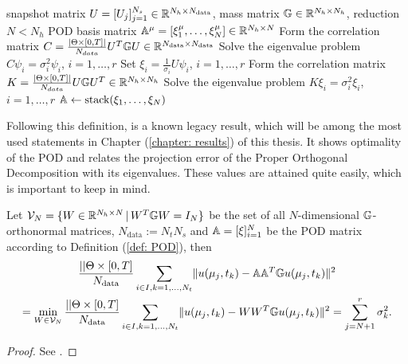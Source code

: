 \begin{algorithm}
    \caption{Generalized Proper Orthogonal Decomposition (POD)} \label{algo: pod}
    \begin{algorithmic}[1]
        \Require snapshot matrix $U = [U_j]_{j=1}^{N_s} \in \mathbb{R}^{N_h \times N_\text{data}}$, 
        mass matrix $\mathbb{G} \in \mathbb{R}^{N_h \times N_h}$,
        reduction $N < N_h$
        \Ensure POD basis matrix $\mathbb{A}^\mu = [\xi^\mu_1, \dots, \xi^\mu_N] \in \mathbb{R}^{N_h \times N}$
            \State Form the correlation matrix $C = \frac{\vert \Theta \times [0, T] \vert}{N_{data}} U^T \mathbb{G} U
            \in \mathbb{R}^{N_\text{data} \times N_\text{data}}$
            \State Solve the eigenvalue problem $C \psi_i = \sigma_i^2 \psi_i$, \quad $i=1,\dots,r$
            \State Set $\xi_i = \tfrac{1}{\sigma_i} U \psi_i$, \quad $i=1,\dots,r$
        \Else
            \State Form the correlation matrix $K = \frac{\vert \Theta \times [0, T] \vert}{N_{data}} 
            U \mathbb{G} U^T \in \mathbb{R}^{N_h \times N_h}$
            \State Solve the eigenvalue problem $K \xi_i = \sigma_i^2 \xi_i$, \quad $i=1,\dots,r$
        \EndIf
        \State $\mathbb{A} \gets \text{stack}(\xi_1, \dots, \xi_N)$
    \end{algorithmic}
\end{algorithm}


Following this definition, is a known legacy result, which will be among
the most used statements in Chapter (\ref{chapter: results}) of this thesis.
It shows optimality of the POD 
and relates the projection error of the Proper Orthogonal Decomposition with its eigenvalues. 
These values are attained quite easily, which is important to keep in mind. 


\begin{proposition} \label{prop: eigenvalues and optimal projection under sampling}
    Let $\mathcal{V}_N = \{ W \in \mathbb{R}^{N_h \times N} \, \vert \, W^T \mathbb{G} W = I_N \}$ be the set of all 
    $N$-dimensional $\mathbb{G}$-orthonormal matrices, 
    $N_\text{data} := N_t N_s$ and $\mathbb{A} = [\xi]_{i=1}^N$ be the POD matrix according to Definition
    (\ref{def: POD}), then
    \begin{multline*}
        \frac{\lvert  \rvert\Theta \times [0, T]}{N_\text{data}}
        \sum\limits_{i \in I, k = 1, \dots, N_t} \lVert u(\mu_j, t_k) - \mathbb{A} \mathbb{A}^T \mathbb{G} u(\mu_j, t_k) \rVert^2 \\
        = \min\limits_{W \in \mathcal{V}_N} \frac{\lvert  \rvert\Theta \times [0, T]}{N_\text{data}} 
        \sum\limits_{i \in I, k = 1, \dots, N_t} 
        \lVert u(\mu_j, t_k) - W W^T \mathbb{G} u(\mu_j, t_k) \rVert^2 
        = \sum_{j=N+1}^r \sigma_k^2.
    \end{multline*}
\end{proposition}
\begin{proof}
    See \cite[p.125--126]{quarteroni2015rb}.
\end{proof}

